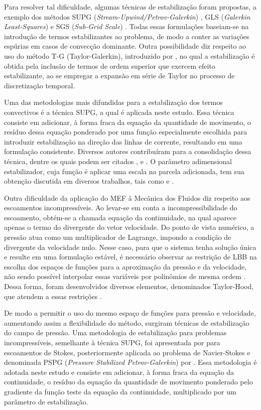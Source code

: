 Para resolver tal dificuldade, algumas técnicas de estabilização foram propostas, a exemplo dos métodos SUPG (\textit{Stream-Upwind/Petrov-Galerkin}) \cite{BrooksH:1982}, GLS (\textit{Galerkin Least-Squares}) \cite{HughesFH:1989} e SGS (\textit{Sub-Grid Scale}) \cite{Hughes:1995}. Todas essas formulações baseiam-se na introdução de termos estabilizantes ao problema, de modo a conter as variações espúrias em casos de convecção dominante. Outra possibilidade diz respeito ao uso do método T-G (Taylor-Galerkin), introduzido por , no qual a estabilização é obtida pela inclusão de termos de ordem superior que exercem efeito estabilizante, ao se empregar a expansão em série de Taylor no processo de discretização temporal.

Uma das metodologias mais difundidas para a estabilização dos termos convectivos é a técnica SUPG, a qual é aplicada neste estudo. Essa técnica consiste em adicionar, à forma fraca da equação da quantidade de movimento, o resíduo dessa equação ponderado por uma função especialmente escolhida para introduzir estabilização na direção das linhas de corrente, resultando em uma formulação consistente. Diversos autores contribuíram para a consolidação dessa técnica, dentre os quais podem ser citados ,  e . O parâmetro adimensional estabilizador, cuja função é aplicar uma escala na parcela adicionada, tem sua obtenção discutida em diversos trabalhos, tais como  e .

Outra dificuldade da aplicação do MEF à Mecânica dos Fluidos diz respeito aos escoamentos incompressíveis. Ao levar-se em conta a incompressibilidade do escoamento, obtém-se a chamada equação da continuidade, na qual aparece apenas o termo do divergente do vetor velocidade. Do ponto de vista numérico, a pressão atua como um multiplicador de Lagrange, impondo a condição de divergente da velocidade nulo. Nesse caso, para que o sistema tenha solução única e resulte em uma formulação estável, é necessário observar as restrição de LBB na escolha dos espaços de funções para a aproximação da pressão e da velocidade, não sendo possível interpolar essas variáveis por polinômios de mesma ordem \cite{BrezziF:1991,StrangF:2008,ZienkiewiczTN:2014}. Dessa forma, foram desenvolvidos diversos elementos, denominados Taylor-Hood, que atendem a essas restrições \cite{DoneaH:2003}.

De modo a permitir o uso do mesmo espaço de funções para pressão e velocidade, aumentando assim a flexibilidade do método, surgiram técnicas de estabilização do campo de pressão. Uma metodologia de estabilização para problemas incompressíveis, semelhante à técnica SUPG, foi apresentada por  para escoamentos de Stokes, posteriormente aplicada ao problema de Navier-Stokes e denominada PSPG (\textit{Pressure Stabilized Petrov-Galerkin}) por . Essa metodologia é adotada neste estudo e consiste em adicionar, à forma fraca da equação da continuidade, o resíduo da equação da quantidade de movimento ponderado pelo gradiente da função teste da equação da continuidade, multiplicado por um parâmetro de estabilização.

